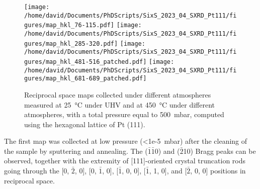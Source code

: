 

\begin{figure}[!htb]
    \centering
    \texttt{[image: /home/david/Documents/PhDScripts/SixS\_2023\_04\_SXRD\_Pt111/figures/map\_hkl\_76-115.pdf]}
    \texttt{[image: /home/david/Documents/PhDScripts/SixS\_2023\_04\_SXRD\_Pt111/figures/map\_hkl\_285-320.pdf]}
    \texttt{[image: /home/david/Documents/PhDScripts/SixS\_2023\_04\_SXRD\_Pt111/figures/map\_hkl\_481-516\_patched.pdf]}
    \texttt{[image: /home/david/Documents/PhDScripts/SixS\_2023\_04\_SXRD\_Pt111/figures/map\_hkl\_681-689\_patched.pdf]}
    \caption{
        Reciprocal space maps collected under different atmospheres measured at \qty{25}{\degreeCelsius} under UHV and at \qty{450}{\degreeCelsius} under different atmospheres, with a total pressure equal to \qty{500}{\milli\bar}, computed using the hexagonal lattice of Pt (111).
    }
    \label{fig:MapsPt111A}
\end{figure}

The first map was collected at low pressure (\qty{<1e-5}{\milli\bar}) after the cleaning of the sample by sputtering and annealing.
The ($\bar{1}$$\bar{1}$0) and ($\bar{2}$10) Bragg peaks can be observed, together with the extremity of [111]-oriented crystal truncation rods going through the [0, $\bar{2}$, 0], [0, $\bar{1}$, 0], [$\bar{1}$, 0, 0], [$\bar{1}$, 1, 0], and [$\bar{2}$, 0, 0] positions in reciprocal space.

